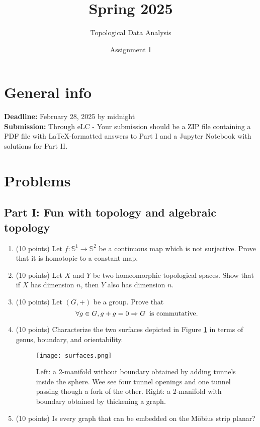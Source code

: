 \documentclass{exam}
\title{Spring 2025}
\author{Topological Data Analysis}
\date{Assignment 1}
\newcommand{\Sp}{\mathbb{S}}
\newcommand{\mobius}{M\"{o}bius }
\begin{document}
\maketitle

\section*{General info} 
\textbf{Deadline:} February 28, 2025 by midnight \\
\textbf{Submission:} Through eLC - Your submission should be a ZIP file containing a PDF file with LaTeX-formatted answers to Part I and a Jupyter Notebook with solutions for Part II.

\section*{Problems}

\subsection*{Part I: Fun with topology and algebraic topology}

\begin{enumerate}
    \item (10 points) Let $f: \Sp^1 \rightarrow \Sp^2$ be a continuous map which is not surjective. Prove that it is homotopic to a constant map.

    \item (10 points) Let $X$ and $Y$ be two homeomorphic topological spaces. Show that if $X$ has dimension $n$, then $Y$ also has dimension $n$.

    \item (10 points) Let $(G,+)$ be a group. Prove that
    $$ \forall g \in G, g+g = 0 \Rightarrow G \hspace{0.2cm} \text{is commutative}.$$

    \item (10 points) Characterize the two surfaces depicted in Figure \ref{fig:surfaces}  in terms of genus, boundary, and orientability.

    \begin{figure}[ht]
        \centering
        \texttt{[image: surfaces.png]}
        \caption{Left: a 2-manifold without boundary obtained by adding tunnels inside the sphere. Wee see four tunnel openings and one tunnel passing though a fork of the other. Right: a 2-manifold with boundary obtained by thickening a graph.}
        \label{fig:surfaces}
    \end{figure}

    \item (10 points) Is every graph that can be embedded on the \mobius strip planar?
\end{enumerate}
\end{document}

